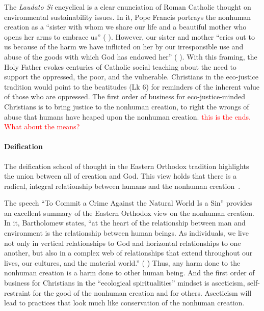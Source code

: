 \documentclass[12pt]{article}
\newcommand{\ins}[1]{\textcolor{red}{#1}}
\begin{document}
The \emph{Laudato Si} encyclical \autocite{Pope-Francis:2015aa} 
is a clear enunciation of Roman Catholic thought
on environmental sustainability issues.
In it, Pope Francis portrays the nonhuman creation as a
``sister with whom we share our life and a beautiful mother who opens her arms to embrace us''
(\textcite{Pope-Francis:2015aa} \textcite[3]{Pope-Francis:2015aa}).
However, our sister and mother
``cries out to us because of the harm we have inflicted on her 
by our irresponsible use and abuse of the goods with which God has endowed her''
(\textcite{Pope-Francis:2015aa} \textcite[3]{Pope-Francis:2015aa}).
With this framing, the Holy Father evokes centuries of Catholic social teaching
about the need to support the oppressed, the poor, and the vulnerable.
Christians in the eco-justice tradition would point to the beatitudes (Lk 6) 
for reminders of the inherent value of those who are oppressed.
The first order of business for eco-justice-minded Christians
is to bring justice to the nonhuman creation, to right the wrongs
of abuse that humans have heaped upon the nonhuman creation.
\ins{this is the ends. What about the means?}

\paragraph{Deification} 
\label{sec:deification}

The deification school of thought in the Eastern Orthodox tradition
highlights the union between all of creation and God.
This view holds that there is a radical, integral relationship between humans and 
the nonhuman creation~\autocite[93]{Jenkins:2008}.

The speech ``To Commit a Crime Against the Natural World Is a Sin'' 
\autocite[133-136]{Bartholomew-I-of-Constantinople:2011aa}
provides an excellent summary of the Eastern Orthodox view
on the nonhuman creation.
In it, Bartholomew states,
``at the heart of the relationship between man and environment 
is the relationship between human beings.
As individuals, we live not only in vertical relationships to God 
and horizontal relationships to one another, but 
also in a complex web of relationships that extend throughout
our lives, our cultures, and the material world.''
(\textcite{Bartholomew-I-of-Constantinople:2011aa} 
\textcite[133--134]{Bartholomew-I-of-Constantinople:2011aa})
Thus, any harm done to the nonhuman creation is a harm done to other human being. 
And the first order of business for Christians in the ``ecological spiritualities'' mindset %
is asceticism, self-restraint for the good of the nonhuman creation and for others. %
Asceticism will lead to practices that look much like conservation of the nonhuman creation.
\end{document}
